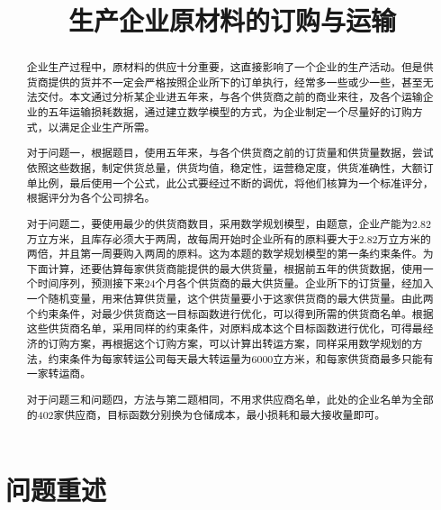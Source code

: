 \documentclass[withoutpreface,bwprint]{cumcmthesis} %
\title{生产企业原材料的订购与运输}  %
\begin{document}
\maketitle
\begin{abstract}  %
企业生产过程中，原材料的供应十分重要，这直接影响了一个企业的生产活动。但是供货商提供的货并不一定会严格按照企业所下的订单执行，经常多一些或少一些，甚至无法交付。本文通过分析某企业进五年来，与各个供货商之前的商业来往，及各个运输企业的五年运输损耗数据，通过建立数学模型的方式，为企业制定一个尽量好的订购方式，以满足企业生产所需。

对于问题一，根据题目，使用五年来，与各个供货商之前的订货量和供货量数据，尝试依照这些数据，制定供货总量，供货均值，稳定性，运营稳定度，供货准确性，大额订单比例，最后使用一个公式，此公式要经过不断的调优，将他们核算为一个标准评分，根据评分为各个公司排名。

对于问题二，要使用最少的供货商数目，采用数学规划模型，由题意，企业产能为2.82万立方米，且库存必须大于两周，故每周开始时企业所有的原料要大于2.82万立方米的两倍，并且第一周要购入两周的原料。这为本题的数学规划模型的第一条约束条件。为下面计算，还要估算每家供货商能提供的最大供货量，根据前五年的供货数据，使用一个时间序列，预测接下来24个月各个供货商的最大供货量。企业所下的订货量，经加入一个随机变量，用来估算供货量，这个供货量要小于这家供货商的最大供货量。由此两个约束条件，对最少供货商这一目标函数进行优化，可以得到所需的供货商名单。根据这些供货商名单，采用同样的约束条件，对原料成本这个目标函数进行优化，可得最经济的订购方案，再根据这个订购方案，可以计算出转运方案，同样采用数学规划的方法，约束条件为每家转运公司每天最大转运量为6000立方米，和每家供货商最多只能有一家转运商。

对于问题三和问题四，方法与第二题相同，不用求供应商名单，此处的企业名单为全部的402家供应商，目标函数分别换为仓储成本，最小损耗和最大接收量即可。

\end{abstract}


\section{问题重述}
\end{document}

